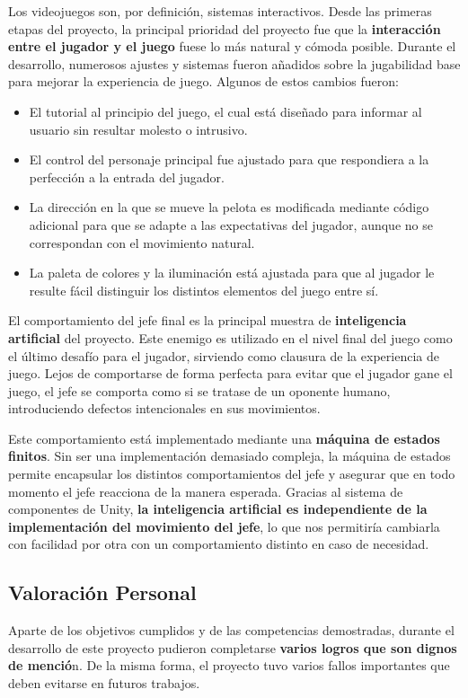 Los videojuegos son, por definición, sistemas interactivos. Desde las primeras etapas del proyecto, la principal prioridad del proyecto fue que la \textbf{interacción entre el jugador y el juego} fuese lo más natural y cómoda posible. Durante el desarrollo, numerosos ajustes y sistemas fueron añadidos sobre la jugabilidad base para mejorar la experiencia de juego. Algunos de estos cambios fueron:
\begin{itemize}
\item El tutorial al principio del juego, el cual está diseñado para informar al usuario sin resultar molesto o intrusivo.
\item El control del personaje principal fue ajustado para que respondiera a la perfección a la entrada del jugador. 
\item La dirección en la que se mueve la pelota es modificada mediante código adicional para que se adapte a las expectativas del jugador, aunque no se correspondan con el movimiento natural.
\item La paleta de colores y la iluminación está ajustada para que al jugador le resulte fácil distinguir los distintos elementos del juego entre sí.
\end{itemize}

El comportamiento del jefe final es la principal muestra de \textbf{inteligencia artificial} del proyecto. Este enemigo es utilizado en el nivel final del juego como el último desafío para el jugador, sirviendo como clausura de la experiencia de juego. Lejos de comportarse de forma perfecta para evitar que el jugador gane el juego, el jefe se comporta como si se tratase de un oponente humano, introduciendo defectos intencionales en sus movimientos.

Este comportamiento está implementado mediante una \textbf{máquina de estados finitos}. Sin ser una implementación demasiado compleja, la máquina de estados permite encapsular los distintos comportamientos del jefe y asegurar que en todo momento el jefe reacciona de la manera esperada. Gracias al sistema de componentes de Unity, \textbf{la inteligencia artificial es independiente de la implementación del movimiento del jefe}, lo que nos permitiría cambiarla con facilidad por otra con un comportamiento distinto en caso de necesidad.

\subsection{Valoración Personal}
Aparte de los objetivos cumplidos y de las competencias demostradas, durante el desarrollo de este proyecto pudieron completarse \textbf{varios logros que son dignos de menció}n. De la misma forma, el proyecto tuvo varios fallos importantes que deben evitarse en futuros trabajos.

